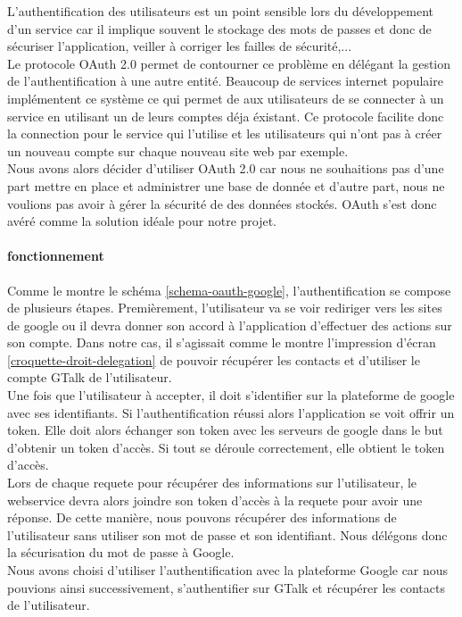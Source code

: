 L'authentification des utilisateurs est un point sensible lors du développement d'un service car il
implique souvent le stockage des mots de passes et donc de sécuriser l'application, veiller à corriger
les failles de sécurité,... 
\\ 
Le protocole OAuth 2.0 permet de contourner ce problème en délégant la gestion de l'authentification
à une autre entité. Beaucoup de services internet populaire implémentent ce système ce qui permet de 
aux utilisateurs de se connecter à un service en utilisant un de leurs comptes déja éxistant. Ce 
protocole facilite donc la connection pour le service qui l'utilise et les utilisateurs qui n'ont pas 
à créer un nouveau compte sur chaque nouveau site web par exemple.
\\
Nous avons alors décider d'utiliser OAuth 2.0 car nous ne souhaitions pas d'une part mettre en place 
et administrer une base de donnée et d'autre part, nous ne voulions pas avoir à gérer la sécurité de 
des données stockés. OAuth s'est donc avéré comme la solution idéale pour notre projet.
\\
\paragraph{fonctionnement}

Comme le montre le schéma \ref{schema-oauth-google}, l'authentification se compose de plusieurs étapes.
Premièrement, l'utilisateur va se voir rediriger vers les sites de google ou il devra donner son accord
à l'application d'effectuer des actions sur son compte. Dans notre cas, il s'agissait comme le montre
l'impression d'écran \ref{croquette-droit-delegation} de pouvoir récupérer les contacts et d'utiliser 
le compte GTalk de l'utilisateur.
\\
Une fois que l'utilisateur à accepter, il doit s'identifier sur la plateforme de google avec ses identifiants.
Si l'authentification réussi alors l'application se voit offrir un token. Elle doit alors échanger 
son token avec les serveurs de google dans le but d'obtenir un token d'accès. Si tout se déroule correctement,
elle obtient le token d'accès.
\\
Lors de chaque requete pour récupérer des informations sur l'utilisateur, le webservice devra alors
joindre son token d'accès à la requete pour avoir une réponse. De cette manière, nous pouvons récupérer
des informations de l'utilisateur sans utiliser son mot de passe et son identifiant. Nous délégons donc
la sécurisation du mot de passe à Google.
\\
Nous avons choisi d'utiliser l'authentification avec la plateforme Google car nous pouvions ainsi 
successivement, s'authentifier sur GTalk et récupérer les contacts de l'utilisateur.




